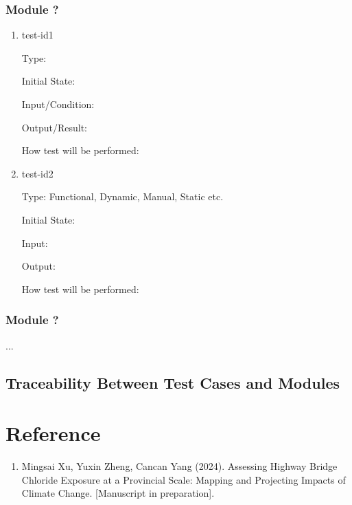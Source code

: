 \documentclass[12pt, titlepage]{article}
\newcounter{refnum} %
\begin{document}

\subsubsection{Module ?}
		
\begin{enumerate}

\item{test-id1\\}

Type: 
					
Initial State: 
					
Input/Condition: 
					
Output/Result: 
					
How test will be performed: 
					
\item{test-id2\\}

Type: Functional, Dynamic, Manual, Static etc.
					
Initial State: 
					
Input: 
					
Output: 
					
How test will be performed: 

\end{enumerate}

\subsubsection{Module ?}

...

\subsection{Traceability Between Test Cases and Modules}

				
%

%

\section*{Reference}
\begin{enumerate}
\item {} \label{ref1}
Mingsai Xu, Yuxin Zheng, Cancan Yang (2024). Assessing Highway Bridge Chloride Exposure at a Provincial Scale: Mapping and Projecting Impacts of Climate Change.  [Manuscript in preparation].

\end{enumerate}
\end{document}

